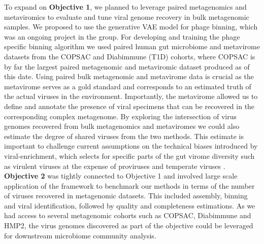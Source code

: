 \noindent
To expand on \textbf{Objective 1}, we planned to leverage paired metagenomics and metaviromics to evaluate and tune viral genome recovery in bulk metagenomic samples. We proposed to use the generative VAE model for phage binning, which was an ongoing project in the group. For developing and training the phage specific binning algorithm we used paired human gut microbiome and metavirome datasets from the COPSAC and Diabimmune (T1D) cohorts, where COPSAC is by far the largest paired metagenomic and metaviromic dataset produced as of this date. Using paired bulk metagenomic and metavirome data is crucial as the metavirome serves as a gold standard and corresponds to an estimated truth of the actual viruses in the environment. Importantly, the metavirome allowed us to define and annotate the presence of viral specimens that can be recovered in the corresponding complex metagenome. By exploring the intersection of virus genomes recovered from bulk metagenomics and metaviromes we could also estimate the degree of shared viruses from the two methods. This estimate is important to challenge current assumptions on the technical biases introduced by viral-enrichment, which selects for specific parts of the gut virome diversity such as virulent viruses at the expense of proviruses and temperate viruses \cite{Roux2019-dc}.\\

\noindent
\textbf{Objective 2} was tightly connected to Objective 1 and involved large scale application of the framework to benchmark our methods in terms of the number of viruses recovered in metagenomic datasets. This included assembly, binning and viral identification, followed by quality and completeness estimations. As we had access to several metagenomic cohorts such as COPSAC, Diabimmune and HMP2, the virus genomes discovered as part of the objective could be leveraged for downstream microbiome community analysis.\\

